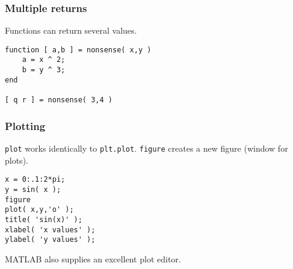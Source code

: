 \documentclass[11pt]{beamer}
\begin{document}
\begin{frame}[fragile]
  \frametitle{Multiple returns}
  \Enlarge

  \begin{enumerate}
  \myitem  Functions can return several values.  \pause
  \end{enumerate}
  \begin{Verbatim}
function [ a,b ] = nonsense( x,y )
    a = x ^ 2;
    b = y ^ 3;
end

[ q r ] = nonsense( 3,4 )
  \end{Verbatim}
\end{frame}



\begin{frame}[fragile]
  \frametitle{Plotting}
  \Enlarge

  \begin{enumerate}
  \myitem  \texttt{plot} works identically to \texttt{plt.plot}.  \pause
  \myitem  \texttt{figure} creates a new figure (window for plots).  \pause
  \end{enumerate}
  \begin{Verbatim}
x = 0:.1:2*pi;
y = sin( x );
figure
plot( x,y,'o' );
title( 'sin(x)' );
xlabel( 'x values' );
ylabel( 'y values' );
  \end{Verbatim}
  \pause
  \begin{enumerate}
  \myitem  MATLAB also supplies an excellent plot editor.
  \end{enumerate}
\end{frame}
\end{document}
